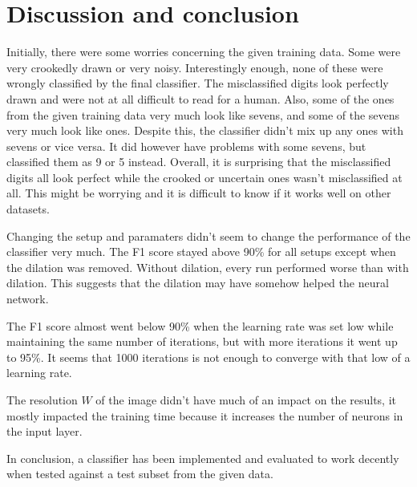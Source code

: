 \documentclass[report.tex]{subfile}
\begin{document}
\section{Discussion and conclusion}
Initially, there were some worries concerning the given training data. Some
were very crookedly drawn or very noisy. Interestingly enough, none of these
were wrongly classified by the final classifier. The misclassified digits look
perfectly drawn and were not at all difficult to read for a human. Also, some
of the ones from the given training data very much look like sevens, and some
of the sevens very much look like ones. Despite this, the classifier didn't mix
up any ones with sevens or vice versa. It did however have problems with some
sevens, but classified them as 9 or 5 instead. Overall, it is surprising that
the misclassified digits all look perfect while the crooked or uncertain ones
wasn't misclassified at all. This might be worrying and it is difficult to know
if it works well on other datasets.

Changing the setup and paramaters didn't seem to change the performance of the
classifier very much. The F1 score stayed above 90\% for all setups except when
the dilation was removed. Without dilation, every run performed worse than with
dilation. This suggests that the dilation may have somehow helped the neural
network.

The F1 score almost went below 90\% when the learning rate was set low while
maintaining the same number of iterations, but with more iterations it went up
to 95\%. It seems that 1000 iterations is not enough to converge with that low
of a learning rate.

The resolution $W$ of the image didn't have much of an impact on the results,
it mostly impacted the training time because it increases the number of neurons
in the input layer.

In conclusion, a classifier has been implemented and evaluated to work decently
when tested against a test subset from the given data.
\end{document}
